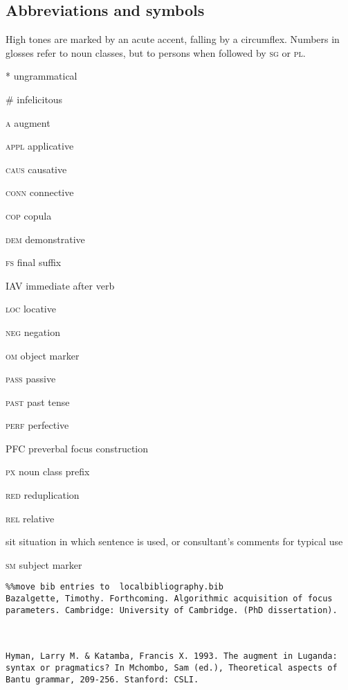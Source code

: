 \documentclass[output=paper]{langsci/langscibook}
\begin{document}
\subsection{Abbreviations and symbols}

High tones are marked by an acute accent, falling by a circumflex. Numbers in glosses refer to noun classes, but to persons when followed by \textsc{sg} or \textsc{pl}.

*  ungrammatical

\#  infelicitous

\textsc{a}  augment

\textsc{appl}  applicative

\textsc{caus}  causative

\textsc{conn}  connective

\textsc{cop}  copula

\textsc{dem}  demonstrative

\textsc{fs}  final suffix

IAV  immediate after verb

\textsc{loc}  locative

\textsc{neg}  negation

\textsc{om}  object marker

\textsc{pass}  passive

\textsc{past}  past tense

\textsc{perf}  perfective

PFC  preverbal focus construction

\textsc{px}  noun class prefix

\textsc{red}  reduplication

\textsc{rel}  relative

sit  situation in which sentence is used, or consultant’s comments for typical use

\textsc{sm}  subject marker

\begin{verbatim}%%move bib entries to  localbibliography.bib
Bazalgette, Timothy. Forthcoming. Algorithmic acquisition of focus parameters. Cambridge: University of Cambridge. (PhD dissertation).



Hyman, Larry M. & Katamba, Francis X. 1993. The augment in Luganda: syntax or pragmatics? In Mchombo, Sam (ed.), Theoretical aspects of Bantu grammar, 209-256. Stanford: CSLI.




\end{verbatim}
 

\printbibliography[heading=subbibliography,notkeyword=this]
\end{document}
